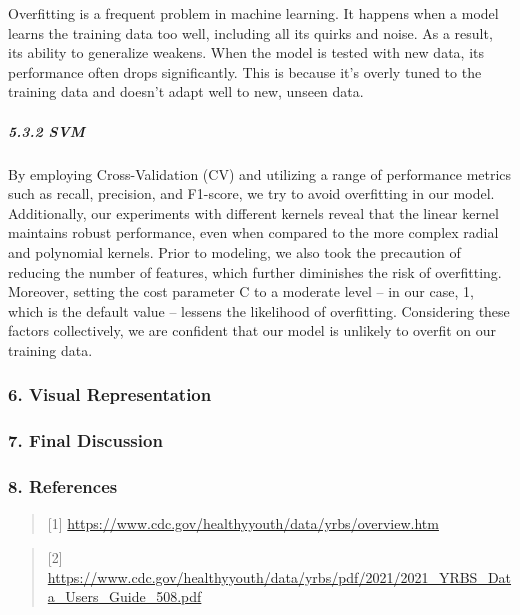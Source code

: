 \documentclass[
]{article}
\begin{document}
Overfitting is a frequent problem in machine learning. It happens when a
model learns the training data too well, including all its quirks and
noise. As a result, its ability to generalize weakens. When the model is
tested with new data, its performance often drops significantly. This is
because it's overly tuned to the training data and doesn't adapt well to
new, unseen data.

\hypertarget{svm-2}{%
\subparagraph{5.3.2 SVM}\label{svm-2}}

By employing Cross-Validation (CV) and utilizing a range of performance
metrics such as recall, precision, and F1-score, we try to avoid
overfitting in our model. Additionally, our experiments with different
kernels reveal that the linear kernel maintains robust performance, even
when compared to the more complex radial and polynomial kernels. Prior
to modeling, we also took the precaution of reducing the number of
features, which further diminishes the risk of overfitting. Moreover,
setting the cost parameter C to a moderate level -- in our case, 1,
which is the default value -- lessens the likelihood of overfitting.
Considering these factors collectively, we are confident that our model
is unlikely to overfit on our training data.

\hypertarget{visual-representation}{%
\subsubsection{6. Visual Representation}\label{visual-representation}}

\hypertarget{final-discussion}{%
\subsubsection{7. Final Discussion}\label{final-discussion}}

\hypertarget{references}{%
\subsubsection{8. References}\label{references}}

\begin{quote}
{[}1{]} \url{https://www.cdc.gov/healthyyouth/data/yrbs/overview.htm}
\end{quote}

\begin{quote}
{[}2{]}
\url{https://www.cdc.gov/healthyyouth/data/yrbs/pdf/2021/2021_YRBS_Data_Users_Guide_508.pdf}
\end{quote}
\end{document}
